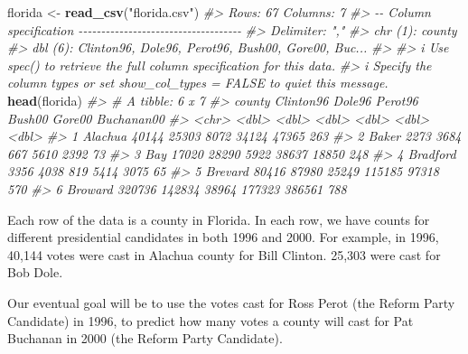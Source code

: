 \documentclass[
]{book}
\newenvironment{Shaded}{\begin{snugshade}}{\end{snugshade}}
\newcommand{\CommentTok}[1]{\textcolor[rgb]{0.56,0.35,0.01}{\textit{#1}}}
\newcommand{\FunctionTok}[1]{\textcolor[rgb]{0.13,0.29,0.53}{\textbf{#1}}}
\newcommand{\NormalTok}[1]{#1}
\newcommand{\OtherTok}[1]{\textcolor[rgb]{0.56,0.35,0.01}{#1}}
\newcommand{\StringTok}[1]{\textcolor[rgb]{0.31,0.60,0.02}{#1}}
\begin{document}
\begin{Shaded}
\begin{Highlighting}[]
\NormalTok{florida }\OtherTok{\textless{}{-}} \FunctionTok{read\_csv}\NormalTok{(}\StringTok{"florida.csv"}\NormalTok{)}
\CommentTok{\#\textgreater{} Rows: 67 Columns: 7}
\CommentTok{\#\textgreater{} {-}{-} Column specification {-}{-}{-}{-}{-}{-}{-}{-}{-}{-}{-}{-}{-}{-}{-}{-}{-}{-}{-}{-}{-}{-}{-}{-}{-}{-}{-}{-}{-}{-}{-}{-}{-}{-}{-}{-}}
\CommentTok{\#\textgreater{} Delimiter: ","}
\CommentTok{\#\textgreater{} chr (1): county}
\CommentTok{\#\textgreater{} dbl (6): Clinton96, Dole96, Perot96, Bush00, Gore00, Buc...}
\CommentTok{\#\textgreater{} }
\CommentTok{\#\textgreater{} i Use \textasciigrave{}spec()\textasciigrave{} to retrieve the full column specification for this data.}
\CommentTok{\#\textgreater{} i Specify the column types or set \textasciigrave{}show\_col\_types = FALSE\textasciigrave{} to quiet this message.}
\FunctionTok{head}\NormalTok{(florida)}
\CommentTok{\#\textgreater{} \# A tibble: 6 x 7}
\CommentTok{\#\textgreater{}   county   Clinton96 Dole96 Perot96 Bush00 Gore00 Buchanan00}
\CommentTok{\#\textgreater{}   \textless{}chr\textgreater{}        \textless{}dbl\textgreater{}  \textless{}dbl\textgreater{}   \textless{}dbl\textgreater{}  \textless{}dbl\textgreater{}  \textless{}dbl\textgreater{}      \textless{}dbl\textgreater{}}
\CommentTok{\#\textgreater{} 1 Alachua      40144  25303    8072  34124  47365        263}
\CommentTok{\#\textgreater{} 2 Baker         2273   3684     667   5610   2392         73}
\CommentTok{\#\textgreater{} 3 Bay          17020  28290    5922  38637  18850        248}
\CommentTok{\#\textgreater{} 4 Bradford      3356   4038     819   5414   3075         65}
\CommentTok{\#\textgreater{} 5 Brevard      80416  87980   25249 115185  97318        570}
\CommentTok{\#\textgreater{} 6 Broward     320736 142834   38964 177323 386561        788}
\end{Highlighting}
\end{Shaded}

Each row of the data is a county in Florida. In each row, we have counts for different presidential candidates in both 1996 and 2000. For example, in 1996, 40,144 votes were cast in Alachua county for Bill Clinton. 25,303 were cast for Bob Dole.

Our eventual goal will be to use the votes cast for Ross Perot (the Reform Party Candidate) in 1996, to predict how many votes a county will cast for Pat Buchanan in 2000 (the Reform Party Candidate).
\end{document}
